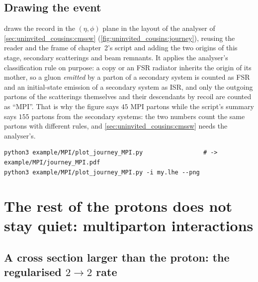 \subsection{Drawing the event}

 draws the record in the $(\eta,\phi)$
plane in the layout of the \CMSSW analyser of
\cref{sec:uninvited_cousins:cmssw} (\cref{fig:uninvited_cousins:journey}),
reusing the reader and the frame of chapter~2's script and adding the two
origins of this stage, secondary scatterings and beam remnants. It applies
the analyser's classification rule on purpose: a copy or an FSR radiator
inherits the origin of its mother, so a gluon \emph{emitted} by a parton of
a secondary system is counted as FSR and an initial-state emission of a
secondary system as ISR, and only the outgoing partons of the scatterings
themselves and their descendants by recoil are counted as ``MPI''. That is
why the figure says $45$ MPI partons while the script's summary says $155$
partons from the secondary systems: the two numbers count the same partons
with different rules, and \cref{sec:uninvited_cousins:cmssw} needs the
analyser's.
\begin{verbatim}
python3 example/MPI/plot_journey_MPI.py                 # -> example/MPI/journey_MPI.pdf
python3 example/MPI/plot_journey_MPI.py -i my.lhe --png
\end{verbatim}

\section{The rest of the protons does not stay quiet: multiparton interactions}
\label{sec:uninvited_cousins:the_rest_of_the_protons_does_not_stay_qu}

\subsection{A cross section larger than the proton: the regularised \texorpdfstring{$2\to2$}{2 to 2} rate}
\label{sec:uninvited_cousins:cross_section}

